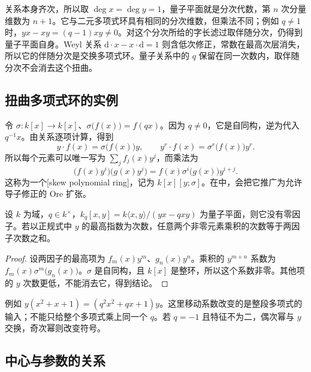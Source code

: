 关系本身齐次，所以取 \(\deg x=\deg y=1\)，量子平面就是分次代数，第 \(n\) 次分量维数为 \(n+1\)。它与二元多项式环具有相同的分次维数，但乘法不同；例如 \(q\ne1\) 时，\(yx-xy=(q-1)xy\ne0\)。对这个分次所给的字长滤过取伴随分次，仍得到量子平面自身。Weyl 关系 \(\mathrm{d}\cdot x-x\cdot\mathrm{d}=1\) 则含低次修正，常数在最高次层消失，所以它的伴随分次是交换多项式环。量子关系中的 \(q\) 保留在同一次数内，取伴随分次不会消去这个扭曲。

\subsection{扭曲多项式环的实例}
\label{b2:subsec:2003:02}

令 \(\sigma:k[x]\to k[x]\)、\(\sigma\bigl(f(x)\bigr)=f(qx)\)。因为 \(q\ne0\)，它是自同构，逆为代入 \(q^{-1}x\)。由关系逐项计算，得到
\[
	y\cdot f(x)=\sigma\bigl(f(x)\bigr)y, \qquad y^r\cdot f(x)=\sigma^r\bigl(f(x)\bigr)y^r.
\]
所以每个元素可以唯一写为 \(\sum_j f_j(x)y^j\)，而乘法为
\[
	\bigl(f(x)y^i\bigr)\bigl(g(x)y^j\bigr) =f(x)\sigma^i\bigl(g(x)\bigr)y^{i+j}.
\]
这称为一个[skew polynomial ring]，记为 \(k[x][y;\sigma]\)。在中，会把它推广为允许导子修正的 Ore 扩张。

\begin{proposition}\label{b2:prop:quantum-plane-domain}
	设 \(k\) 为域，\(q\in k^\times\)，\(k_q[x,y]=k\langle x,y\rangle/(yx-qxy)\) 为量子平面，则它没有零因子。若以正规式中 \(y\) 的最高指数为次数，任意两个非零元素乘积的次数等于两因子次数之和。
\end{proposition}
\begin{proof}
	设两因子的最高项为 \(f_m(x)y^m\)、\(g_n(x)y^n\)。乘积的 \(y^{m+n}\) 系数为 \(f_m(x)\sigma^m\bigl(g_n(x)\bigr)\)。\(\sigma\) 是自同构，且 \(k[x]\) 是整环，所以这个系数非零。其他项的 \(y\) 次数更低，不能消去它，得到结论。
\end{proof}

例如 \(y(x^2+x+1)=(q^2x^2+qx+1)y\)。这里移动系数改变的是整段多项式的输入；不能只给整个多项式乘上同一个 \(q\)。若 \(q=-1\) 且特征不为二，偶次幂与 \(y\) 交换，奇次幂则改变符号。

\subsection{中心与参数的关系}
\label{b2:subsec:2003:03}

